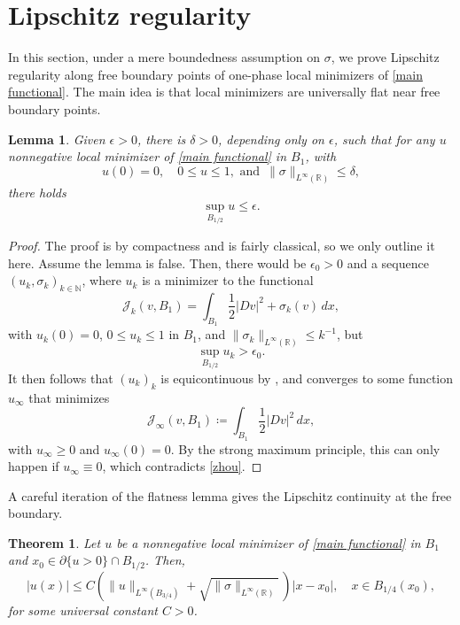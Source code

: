 \documentclass[reqno,11pt]{amsart}
\newtheorem{theorem}{Theorem}[section]
\newtheorem{lemma}{Lemma}[section]
\newcommand{\1}{\mathds{1}}  %
\numberwithin{equation}{section}
\begin{document}
\section{Lipschitz regularity}\label{LIP-sct}

In this section, under a mere boundedness assumption on $\sigma$, we prove Lipschitz regularity along free boundary points of one-phase local minimizers of \eqref{main functional}. The main idea is that local minimizers are universally flat near free boundary points.

\begin{lemma}\label{flat lemma}
Given $\epsilon > 0$, there is $\delta>0$, depending only on $\epsilon$, such that for any $u$ nonnegative local minimizer of \eqref{main functional} in $B_1$, with 
$$
   u(0) = 0, \quad 0 \leq u \leq 1, \text{ and }\, \|\sigma\|_{L^\infty(\mathbb{R})} \leq \delta,
$$
there holds
$$
    \sup_{B_{1/2}} u \leq \epsilon.
$$
\end{lemma}

\begin{proof}
The proof is by compactness and is fairly classical, so we only outline it here. Assume the lemma is false. Then, there would be $\epsilon_0 > 0$ and a sequence $(u_k, \sigma_k)_{k \in \mathbb{N}}$, where $u_k$ is a minimizer to the functional
$$
    \mathcal{J}_k(v,B_1) = \int_{B_1} \frac{1}{2}|Dv|^2 + \sigma_k(v)\,dx,
$$
with $u_k(0) = 0$, $0 \leq u_k \leq 1$ in $B_1$, and $\|\sigma_k\|_{L^\infty(\mathbb{R})} \leq k^{-1}$, but
\begin{equation} \label{zhou}
    \sup_{B_{1/2}}u_k > \epsilon_0.
\end{equation}
It then follows that $\left( u_k \right)_k$ is equicontinuous by , and converges to some function $u_\infty$ that minimizes
$$
    \mathcal{J}_\infty(v,B_1) \coloneqq \int_{B_1} \frac{1}{2}|Dv|^2\, dx,
$$
with $u_\infty \geq 0$ and $u_\infty(0) = 0$. By the strong maximum principle, this can only happen if $u_\infty \equiv 0$, which contradicts \eqref{zhou}.
\end{proof}

A careful iteration of the flatness lemma gives the Lipschitz continuity at the free boundary.

\begin{theorem}\label{Lip at FB}
Let $u$ be a nonnegative local minimizer of \eqref{main functional} in $B_1$ and $x_0 \in \partial \{u>0\} \cap B_{1/2}$. Then,
$$
    |u(x)| \leq C \left( \|u\|_{L^\infty(B_{3/4})} + \sqrt{\|\sigma\|_{L^\infty(\mathbb{R})}}\, \right) |x - x_0|, \quad x \in B_{1/4}(x_0), 
$$
for some universal constant $C>0$.
\end{theorem}
\end{document}
